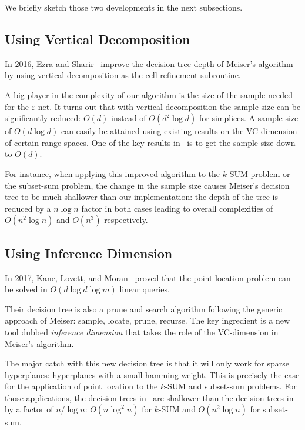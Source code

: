 We briefly sketch those two developments in the next subsections.

\subsection{Using Vertical Decomposition}

In 2016, Ezra and Sharir~\cite{ES17} improve the decision tree depth of
Meiser's algorithm by using vertical decomposition as the cell refinement
subroutine.

A big player in the complexity of our algorithm is the size of the sample
needed for the \(\varepsilon\)-net. It turns out that with
vertical decomposition the sample size can be significantly reduced: $O(d)$
instead of $O(d^2 \log d)$ for simplices.
%
A sample size of $O(d \log d)$ can easily be attained using existing results on
the VC-dimension of certain range spaces. One of the key results in~\cite{ES17}
is to get the sample size down to $O(d)$.

For instance,
when applying this improved algorithm to the \(k\)-SUM problem or the
subset-sum problem,
the change in the sample size causes Meiser's decision tree to be
much shallower than our implementation:
the depth of the tree is reduced by a \(n \log n\) factor in both cases leading
to overall complexities of \(O(n^2 \log n)\) and \(O(n^3)\) respectively.

\subsection{Using Inference Dimension}

In 2017, Kane, Lovett, and Moran~\cite{KLM18} proved that the point location
problem can be solved in \(O(d \log d \log m)\) linear queries.

Their decision tree is also a prune and search algorithm following
the generic approach of Meiser: sample, locate,
prune, recurse. The key ingredient is a new tool dubbed \emph{inference
dimension} that takes the role of the VC-dimension in Meiser's algorithm.

The major catch with this new decision tree is that it will only work for
sparse hyperplanes: hyperplanes with a small hamming weight. This is precisely
the case for the application of point location to the \(k\)-SUM and subset-sum
problems. For those applications, the decision trees in~\cite{KLM18} are shallower than the
decision trees in~\cite{ES17} by a factor of $n / \log n$:
$O(n \log^2 n)$ for \(k\)-SUM and \(O(n^2 \log n)\) for subset-sum.

